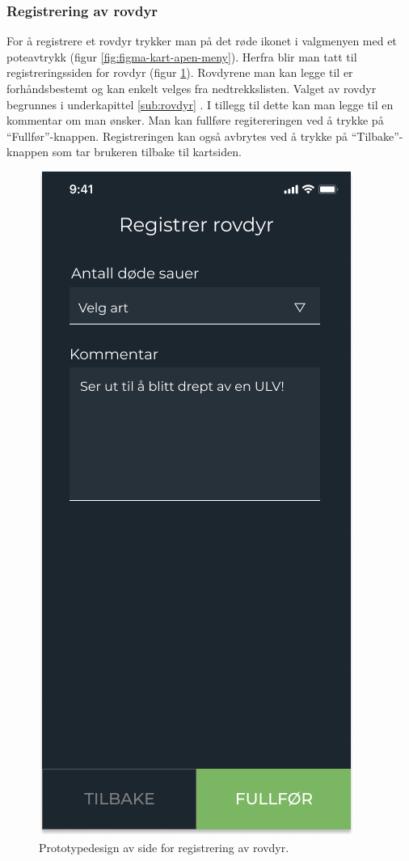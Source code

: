 \subsubsection{Registrering av rovdyr}
For å registrere et rovdyr trykker man på det røde ikonet i valgmenyen med et poteavtrykk (figur \ref{fig:figma-kart-apen-meny}). Herfra blir man tatt til registreringssiden for rovdyr (figur \ref{fig:figma-registrer-rovdyr}). Rovdyrene man kan legge til er forhåndsbestemt og kan enkelt velges fra nedtrekkslisten. Valget av rovdyr begrunnes i underkapittel \ref{sub:rovdyr} . I tillegg til dette kan man legge til en kommentar om man ønsker. Man kan fullføre regitereringen ved å trykke på \enquote{Fullfør}-knappen. Registreringen kan også avbrytes ved å trykke på \enquote{Tilbake}-knappen som tar brukeren tilbake til kartsiden.
\begin{figure}[H]
\centering
\captionsetup{width=.8\linewidth}
\includegraphics[scale=0.4]{Figurer/Figma/Frame 2.2c.1 - Registrer rovdyr.png}
\caption{Prototypedesign av side for registrering av rovdyr.}
\label{fig:figma-registrer-rovdyr}
\end{figure}

